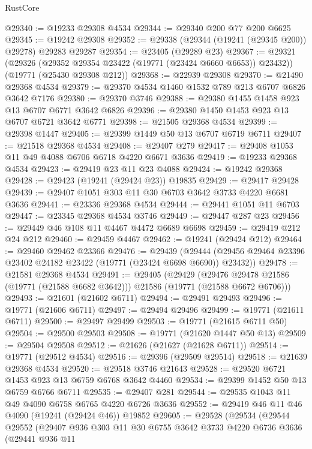 \begin{lexlean}{RustCore}
\begin{coremodule}
@29340 := @19233 @29308 @4534
@29344 := @29340 @200 @77 @200 @6625
@29345 := @19242 @29308
@29352 := @29338 (@29344 (@19241 (@29345 @200)) @29278) @29283 @29287
@29354 := @23405 (@29289 @23)
@29367 := @29321
    (@29326 (@29352 @29354 @23422 (@19771 (@23424 @6660 @6653)) @23432))
    (@19771 (@25430 @29308 @212))
@29368 := @22939 @29308
@29370 := @21490 @29368 @4534
@29379 := @29370 @4534 @1460 @1532 @789 @213 @6707 @6826 @3642 @7176
@29380 := @29370 @3746
@29388 := @29380 @1455 @1458 @923 @13 @6707 @6771 @3642 @6826
@29396 := @29380 @1450 @1453 @923 @13 @6707 @6721 @3642 @6771
@29398 := @21505 @29368 @4534
@29399 := @29398 @1447
@29405 := @29399 @1449 @50 @13 @6707 @6719 @6711
@29407 := @21518 @29368 @4534
@29408 := @29407 @279
@29417 := @29408 @1053 @11 @49 @4088 @6706 @6718 @4220 @6671 @3636
@29419 := @19233 @29368 @4534
@29423 := @29419 @23 @11 @23 @4088
@29424 := @19242 @29368
@29428 := @29423 (@19241 (@29424 @23)) @19835
@29429 := @29417 @29428
@29439 := @29407 @1051 @303 @11 @30 @6703 @3642 @3733 @4220 @6681 @3636
@29441 := @23336 @29368 @4534
@29444 := @29441 @1051 @11 @6703
@29447 := @23345 @29368 @4534 @3746
@29449 := @29447 @287 @23
@29456 := @29449 @46 @108 @11 @4467 @4472 @6689 @6698
@29459 := @29419 @212 @24 @212
@29460 := @29459 @4467
@29462 := @19241 (@29424 @212)
@29464 := @29460 @29462 @23366
@29476 := @29439
    (@29444 (@29456 @29464 @23396 @23402 @24182 @23422 (@19771 (@23424 @6698 @6690)) @23432))
@29478 := @21581 @29368 @4534
@29491 := @29405
    (@29429
      (@29476 @29478 @21586 (@19771 (@21588 @6682 @3642)))
      @21586
      (@19771 (@21588 @6672 @6706)))
@29493 := @21601 (@21602 @6711)
@29494 := @29491 @29493
@29496 := @19771 (@21606 @6711)
@29497 := @29494 @29496
@29499 := @19771 (@21611 @6711)
@29500 := @29497 @29499
@29503 := @19771 (@21615 @6711 @50)
@29504 := @29500 @29503
@29508 := @19771 (@21620 @1447 @50 @13)
@29509 := @29504 @29508
@29512 := @21626 (@21627 (@21628 @6711))
@29514 := @19771 (@29512 @4534)
@29516 := @29396 (@29509 @29514)
@29518 := @21639 @29368 @4534
@29520 := @29518 @3746 @21643
@29528 := @29520 @6721 @1453 @923 @13 @6759 @6768 @3642 @4460
@29534 := @29399 @1452 @50 @13 @6759 @6766 @6711
@29535 := @29407 @281
@29544 := @29535 @1043 @11 @49 @4090 @6758 @6765 @4220 @6726 @3636
@29552 := @29419 @46 @11 @46 @4090 (@19241 (@29424 @46)) @19852
@29605 := @29528
    (@29534
      (@29544
        @29552
        (@29407
          @936
          @303
          @11
          @30
          @6755
          @3642
          @3733
          @4220
          @6736
          @3636
          (@29441
            @936
            @11

\end{coremodule}
\end{lexlean}
